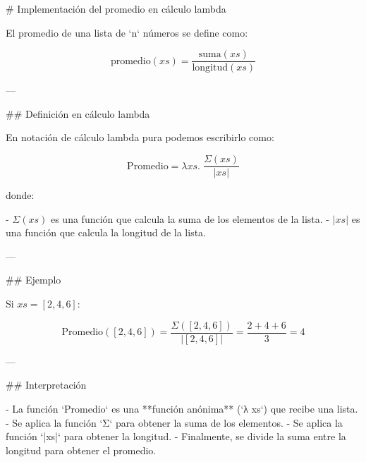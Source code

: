 # Implementación del promedio en cálculo lambda

El promedio de una lista de `n` números se define como:

\[
\text{promedio}(xs) = \frac{\text{suma}(xs)}{\text{longitud}(xs)}
\]

---

## Definición en cálculo lambda

En notación de cálculo lambda pura podemos escribirlo como:

\[
\text{Promedio} = \lambda xs.\; \frac{\Sigma(xs)}{|xs|}
\]

donde:

- \(\Sigma(xs)\) es una función que calcula la suma de los elementos de la lista.
- \(|xs|\) es una función que calcula la longitud de la lista.

---

## Ejemplo

Si \(xs = [2,4,6]\):

\[
\text{Promedio}([2,4,6]) 
= \frac{\Sigma([2,4,6])}{|[2,4,6]|} 
= \frac{2+4+6}{3} 
= 4
\]

---

## Interpretación

- La función `Promedio` es una **función anónima** (`λ xs`) que recibe una lista.
- Se aplica la función `Σ` para obtener la suma de los elementos.
- Se aplica la función `|xs|` para obtener la longitud.
- Finalmente, se divide la suma entre la longitud para obtener el promedio.
